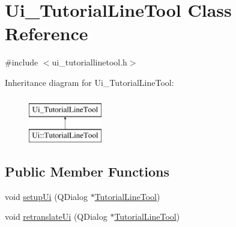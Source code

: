 \hypertarget{class_ui___tutorial_line_tool}{}\section{Ui\+\_\+\+Tutorial\+Line\+Tool Class Reference}
\label{class_ui___tutorial_line_tool}


{\ttfamily \#include $<$ui\+\_\+tutoriallinetool.\+h$>$}

Inheritance diagram for Ui\+\_\+\+Tutorial\+Line\+Tool\+:\begin{figure}[H]
\begin{center}
\leavevmode
\includegraphics[height=2.000000cm]{class_ui___tutorial_line_tool}
\end{center}
\end{figure}
\subsection*{Public Member Functions}
\begin{DoxyCompactItemize}
\item 
void \hyperlink{class_ui___tutorial_line_tool_a93d6e45a92b3913055a1237d7ca9a572}{setup\+Ui} (Q\+Dialog $\ast$\hyperlink{class_tutorial_line_tool}{Tutorial\+Line\+Tool})
\item 
void \hyperlink{class_ui___tutorial_line_tool_a44f97272d6c2a19a07624b62c707dc01}{retranslate\+Ui} (Q\+Dialog $\ast$\hyperlink{class_tutorial_line_tool}{Tutorial\+Line\+Tool})
\end{DoxyCompactItemize}
